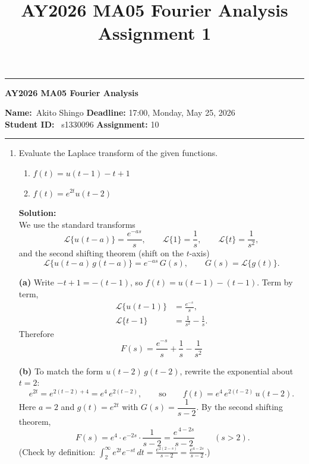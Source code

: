 \documentclass[12pt]{scrartcl}
\title{AY2026 MA05 Fourier Analysis Assignment 1}
\begin{document}
\begin{center}
    \hrule
    \vspace{.4cm}
    {\textbf { \large AY2026 MA05 Fourier Analysis}}
\end{center}
{\textbf{Name:}\ Akito Shingo \hspace{\fill} \textbf{Deadline:} 17:00, Monday, May 25, 2026   \\
{ \textbf{Student ID:}} \ s1330096 \hspace{\fill} \textbf{Assignment:} 10 \\}
    \hrule

\begin{enumerate}

\item
Evaluate the Laplace transform of the given functions.
\begin{enumerate}
\item
$f(t)=u(t-1)-t+1$
\item
$f(t)=e^{2t}u(t-2)$
\end{enumerate}

\textbf{Solution:} \\

We use the standard transforms
\[
\mathcal{L}\{u(t-a)\}=\frac{e^{-as}}{s},\qquad
\mathcal{L}\{1\}=\frac1s,\qquad
\mathcal{L}\{t\}=\frac{1}{s^{2}},
\]
and the second shifting theorem (shift on the $t$-axis)
\[
\mathcal{L}\{u(t-a)\,g(t-a)\}=e^{-as}\,G(s),\qquad G(s)=\mathcal{L}\{g(t)\}.
\]

\textbf{(a)} Write $-t+1=-(t-1)$, so $f(t)=u(t-1)-(t-1)$. Term by term,
\begin{align*}
\mathcal{L}\{u(t-1)\}&=\frac{e^{-s}}{s},\\
\mathcal{L}\{t-1\}&=\frac{1}{s^{2}}-\frac1s .
\end{align*}
Therefore
\[
\boxed{\;F(s)=\frac{e^{-s}}{s}+\frac1s-\frac{1}{s^{2}}\;}
\]

\textbf{(b)} To match the form $u(t-2)\,g(t-2)$, rewrite the exponential about $t=2$:
\[
e^{2t}=e^{2(t-2)+4}=e^{4}\,e^{2(t-2)},
\qquad\text{so}\qquad
f(t)=e^{4}\,e^{2(t-2)}\,u(t-2).
\]
Here $a=2$ and $g(t)=e^{2t}$ with $G(s)=\dfrac{1}{s-2}$. By the second shifting theorem,
\[
\boxed{\;F(s)=e^{4}\cdot e^{-2s}\cdot\frac{1}{s-2}=\frac{e^{\,4-2s}}{s-2}\;}\qquad(s>2).
\]
(Check by definition: $\displaystyle\int_{2}^{\infty}e^{2t}e^{-st}\,dt=\frac{e^{2(2-s)}}{s-2}=\frac{e^{4-2s}}{s-2}$.)


\end{enumerate}
\end{document}
